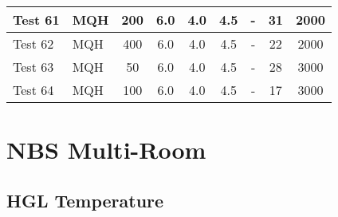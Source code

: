 \begin{table}[!ht]
\begin{center}
\begin{tabular}{|l|l|c|c|c|c|c|c|c|}
Test 61    &  MQH               &  200            &  6.0       &  4.0       &  4.5       &  -              &  31                    &  2000              \\ \hline
Test 62    &  MQH               &  400            &  6.0       &  4.0       &  4.5       &  -              &  22                    &  2000              \\ \hline
Test 63    &  MQH               &  50             &  6.0       &  4.0       &  4.5       &  -              &  28                    &  3000              \\ \hline
Test 64    &  MQH               &  100            &  6.0       &  4.0       &  4.5       &  -              &  17                    &  3000              \\ \hline
\end{tabular}
\end{center}
\end{table}


\clearpage


\section{NBS Multi-Room}

\subsection*{HGL Temperature~\cite{SFPE:Walton}}

